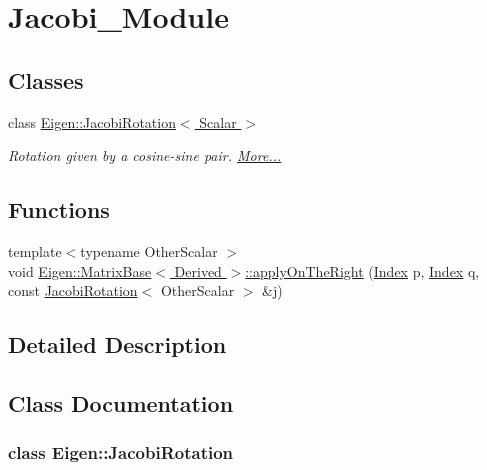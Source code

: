 \hypertarget{group___jacobi___module}{}\section{Jacobi\+\_\+\+Module}
\label{group___jacobi___module}
\subsection*{Classes}
\begin{DoxyCompactItemize}
\item 
class \hyperlink{group___jacobi___module_class_eigen_1_1_jacobi_rotation}{Eigen\+::\+Jacobi\+Rotation$<$ Scalar $>$}
\begin{DoxyCompactList}\small\item\em Rotation given by a cosine-\/sine pair.  \hyperlink{group___jacobi___module_class_eigen_1_1_jacobi_rotation}{More...}\end{DoxyCompactList}\end{DoxyCompactItemize}
\subsection*{Functions}
\begin{DoxyCompactItemize}
\item 
{\footnotesize template$<$typename Other\+Scalar $>$ }\\void \hyperlink{group___jacobi___module_gaa07f741c86219601664433777827bf1c}{Eigen\+::\+Matrix\+Base$<$ Derived $>$\+::apply\+On\+The\+Right} (\hyperlink{namespace_eigen_a62e77e0933482dafde8fe197d9a2cfde}{Index} p, \hyperlink{namespace_eigen_a62e77e0933482dafde8fe197d9a2cfde}{Index} q, const \hyperlink{group___jacobi___module_class_eigen_1_1_jacobi_rotation}{Jacobi\+Rotation}$<$ Other\+Scalar $>$ \&j)
\end{DoxyCompactItemize}


\subsection{Detailed Description}


\subsection{Class Documentation}
\label{class_eigen_1_1_jacobi_rotation}
\subsubsection{class Eigen\+:\+:Jacobi\+Rotation}
